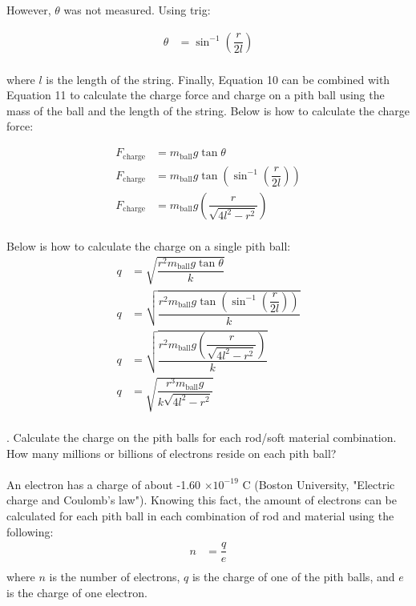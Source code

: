 \documentclass [12pt, letterpaper, twoside] {article}
\begin{document}
\noindent
However, \(\theta\) was not measured. Using trig:

\begin{equation}
  \begin{split}
    \theta &= \sin^{-1}\left(\dfrac{r}{2l}\right) \\
  \end{split}
\end{equation}

\noindent
where \(l\) is the length of the string. Finally, Equation 10 can be combined with Equation 11 to calculate the charge force and charge on a pith ball using the mass of the ball and the length of the string. Below is how to calculate the charge force:

\begin{equation}
  \begin{split}
    F_{\text{charge}} &= m_{\text{ball}}g\tan{\theta} \\
    F_{\text{charge}} &= m_{\text{ball}}g\tan\left({\sin^{-1}\left(\dfrac{r}{2l}\right)}\right) \\
    F_{\text{charge}} &= m_{\text{ball}}g\left(\dfrac{r}{\sqrt{4l^2-r^2}}\right) \\
  \end{split}
\end{equation}

\noindent
Below is how to calculate the charge on a single pith ball:
\begin{equation}
  \begin{split}
    q &= \sqrt{\dfrac{r^{2}m_{\text{ball}}g\tan{\theta}}{k}} \\
    q &= \sqrt{\dfrac{r^{2}m_{\text{ball}}g\tan{\left(\sin^{-1}\left(\dfrac{r}{2l}\right)\right)}}{k}} \\
    q &= \sqrt{\dfrac{r^{2}m_{\text{ball}}g\left(\dfrac{r}{\sqrt{4l^2-r^2}}\right)}{k}} \\
    q &= \sqrt{\dfrac{r^{3}m_{\text{ball}}g}{k\sqrt{4l^2-r^2}}} \\
  \end{split}
\end{equation}

. Calculate the charge on the pith balls for each rod/soft material combination.  How many millions or billions of electrons reside on each pith ball? \\\\
An electron has a charge of about -1.60 \(\times 10^{-19}\) C (Boston University, "Electric charge and Coulomb's law"). Knowing this fact, the amount of electrons can be calculated for each pith ball in each combination of rod and material using the following:
\begin{equation}
  \begin{split}
    n &= \dfrac{q}{e} \\
  \end{split}
\end{equation}
where \(n\) is the number of electrons, \(q\) is the charge of one of the pith balls, and \(e\) is the charge of one electron.
\end{document}
